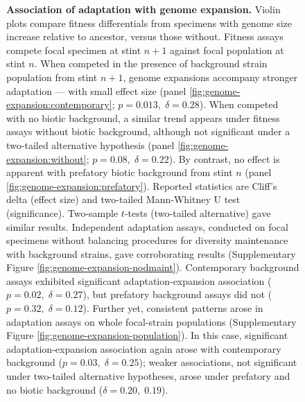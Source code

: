 \begin{figure}
\caption{
    \textbf{Association of adaptation with genome expansion.}
    \footnotesize
    Violin plots compare fitness differentials from specimens with genome size increase relative to ancestor, versus those without.
    Fitness assays compete focal specimen at stint $n+1$ against focal population at stint $n$.
    When competed in the presence of background strain population from stint $n+1$, genome expansions accompany stronger adaptation --- with small effect size (panel \ref{fig:genome-expansion:contemporary}; $p = 0.013, \; \delta = 0.28$).
    When competed with no biotic background, a similar trend appears under fitness assays without biotic background, although not significant under a two-tailed alternative hypothesis (panel \ref{fig:genome-expansion:without}; $p=0.08, \; \delta = 0.22$).
    By contrast, no effect is apparent with prefatory biotic background from stint $n$ (panel \ref{fig:genome-expansion:prefatory}).
    Reported statistics are Cliff's delta (effect size) and two-tailed Mann-Whitney U test (significance).
    Two-sample $t$-tests (two-tailed alternative) gave similar results.
    Independent adaptation assays, conducted on focal specimens without balancing procedures for diversity maintenance with background strains, gave corroborating results (Supplementary Figure \ref{fig:genome-expansion-nodmaint}).
    Contemporary background assays exhibited significant adaptation-expansion association ($p=0.02, \; \delta=0.27$), but prefatory background assays did not ($p=0.32, \; \delta=0.12$).
    Further yet, consistent patterns arose in adaptation assays on whole focal-strain populations (Supplementary Figure \ref{fig:genome-expansion-population}).
    In this case, significant adaptation-expansion association again arose with contemporary background ($p=0.03, \; \delta=0.25$);
    weaker associations, not significant under two-tailed alternative hypotheses, arose under prefatory and no biotic background ($\delta=0.20,\; 0.19$).
}
\label{fig:genome-expansion}

\end{figure}
